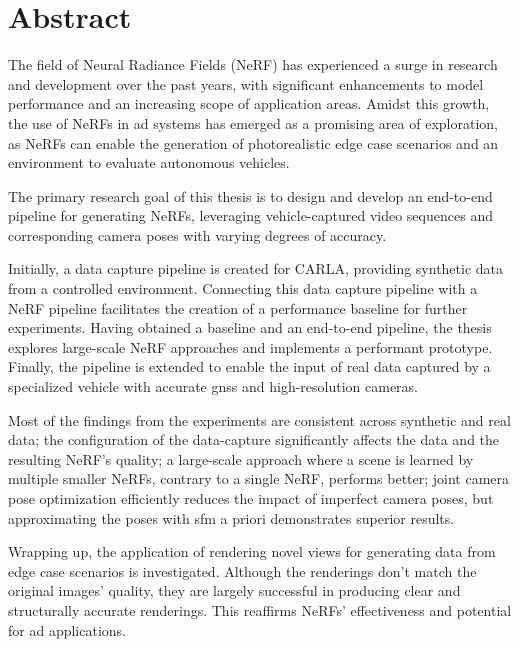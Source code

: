 \chapter*{Abstract}

The field of Neural Radiance Fields (NeRF) has experienced a surge in research and development over the past years, with significant enhancements to model performance and an increasing scope of application areas. Amidst this growth, the use of NeRFs in \acrfull{ad} systems has emerged as a promising area of exploration, as NeRFs can enable the generation of photorealistic edge case scenarios and an environment to evaluate autonomous vehicles.

The primary research goal of this thesis is to design and develop an end-to-end pipeline for generating NeRFs, leveraging vehicle-captured video sequences and corresponding camera poses with varying degrees of accuracy.

Initially, a data capture pipeline is created for CARLA, providing synthetic data from a controlled environment. Connecting this data capture pipeline with a NeRF pipeline facilitates the creation of a performance baseline for further experiments. Having obtained a baseline and an end-to-end pipeline, the thesis explores large-scale NeRF approaches and implements a performant prototype. Finally, the pipeline is extended to enable the input of real data captured by a specialized vehicle with accurate \acrfull{gnss} and high-resolution cameras.

Most of the findings from the experiments are consistent across synthetic and real data; the configuration of the data-capture significantly affects the data and the resulting NeRF's quality; a large-scale approach where a scene is learned by multiple smaller NeRFs, contrary to a single NeRF, performs better; joint camera pose optimization efficiently reduces the impact of imperfect camera poses, but approximating the poses with \acrfull{sfm} a priori demonstrates superior results.



Wrapping up, the application of rendering novel views for generating data from edge case scenarios is investigated. Although the renderings don't match the original images' quality, they are largely successful in producing clear and structurally accurate renderings. This reaffirms NeRFs' effectiveness and potential for \acrshort{ad} applications.